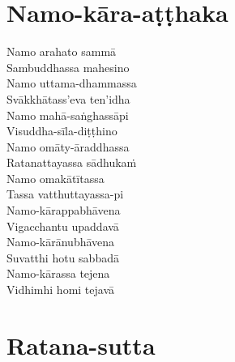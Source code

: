 \clearpage

\chapter{Namo-kāra-aṭṭhaka}


\begin{paritta}
Namo arahato sammā\\
Sambuddhassa mahesino\\
Namo uttama-dhammassa\\
Svākkhātass'eva ten'idha\\
Namo mahā-saṅghassāpi\\
Visuddha-sīla-diṭṭhino\\
Namo omāty-āraddhassa\\
Ratanattayassa sādhukaṁ\\
Namo omakātītassa\\
Tassa vatthuttayassa-pi\\
Namo-kārappabhāvena\\
Vigacchantu upaddavā\\
Namo-kārānubhāvena\\
Suvatthi hotu sabbadā\\
Namo-kārassa tejena\\
Vidhimhi homi tejavā\\
\end{paritta}

\clearpage

\chapter{Ratana-sutta}


